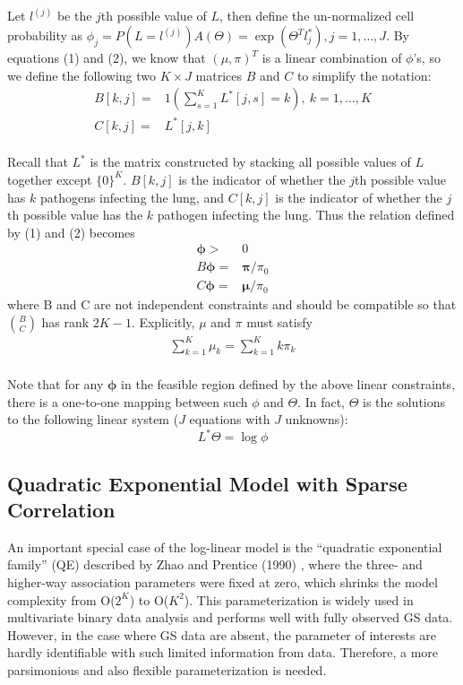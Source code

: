 \documentclass[11 pt, a4paper]{article}  %
\begin{document}
Let $l^{(j)}$ be the $j$th possible value of $L$, then define the un-normalized cell probability as $\phi_j = P(L=l^{(j)})A(\Theta) = \exp(\Theta^T l^*_j), j= 1, \ldots, J$. By equations (1) and (2), we know that $(\mu,\pi)^T$ is a linear combination of $\phi$'s, so we define the following two $K \times J$  matrices $B$ and $C$ to simplify the notation:
\begin{align*}
B[k,j] = & 1(\sum_{s=1}^K L^*[j,s]=k), \ k=1,\ldots,K \\
C[k,j] = & L^*[j,k]
\end{align*}
\\
Recall that $L^*$ is the matrix constructed by stacking all possible values of $L$ together except $\{0\}^K$. $B[k,j]$ is the indicator of whether the $j$th possible value has $k$ pathogens infecting the lung, and $C[k,j]$ is the indicator of whether the $j$th possible value has the $k$ pathogen infecting the lung. Thus the relation defined by (1) and (2) becomes
\begin{align}
\mathbf{\phi} > & 0\\
B \mathbf{\phi} = & \mathbf{\pi}/\pi_0\\ 
C \mathbf{\phi} = & \mathbf{\mu}/\pi_0
\end{align}
where B and C are not independent constraints and should be compatible so that $\binom{B}{C}$ has rank $2K-1$. Explicitly, $\mu$ and $\pi$ must satisfy 
\begin{align}
\sum_{k=1}^K \mu_k = \sum_{k=1}^K k\pi_k
\end{align} 
\\
Note that for any $\mathbf{\phi}$ in the feasible region defined by the above linear constraints, there is a one-to-one mapping between such $\phi$ and $\Theta$. In fact, $\Theta$ is the solutions to the following linear system ($J$ equations with $J$ unknowns):
\[L^*\Theta = \log \phi\]

\subsection{Quadratic Exponential Model with Sparse Correlation}
An important special case of the log-linear model is the ``quadratic exponential family'' (QE) described by Zhao and Prentice (1990) \cite{zhao1990correlated}, where the three- and higher-way association parameters were fixed at zero, which shrinks the model complexity from O($2^K$) to O($K^2$). This parameterization is widely used in multivariate binary data analysis and performs well with fully observed GS data. However, in the case where GS data are absent, the parameter of interests are hardly identifiable with such limited information from data. Therefore, a more parsimonious and also flexible parameterization is needed.\\
\end{document}
